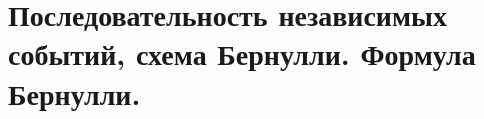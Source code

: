 \documentclass[polytech/stats/exam-2023/stats-exam-2023.tex]{subfiles}
\begin{document}
\section{Последовательность независимых событий, схема Бернулли. Формула Бернулли.}
\end{document}
